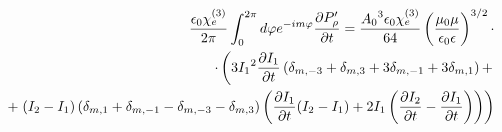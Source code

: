 %
%
%
\begin{equation*} \begin{aligned}
\frac{\epsilon_0 \chi_e^{(3)}}{2 \pi} \int_{0}^{2\pi} d \varphi 
e^{-im \varphi} \frac{\partial P_\rho^\prime}{\partial t} = 
\frac{ {A_0}^3 \epsilon_0 \chi_e^{(3)}}{ 64 } 
\left( \frac{\mu_0 \mu} {\epsilon_0 \epsilon} \right)^{3/2} \cdot \\ 
\cdot \left( 3 {I_1}^2 \frac{\partial I_1}{\partial t} \left( \delta_{m,-3} + 
\delta_{m,3} + 3 \delta_{m,-1} + 3 \delta_{m,1} \right) + \right. \\
+ \left. ( I_2 - I_1 ) \left( \delta_{m,1} + \delta_{m,-1} - 
\delta_{m,-3} - \delta_{m,3} \right) \left( 
\frac{\partial I_1}{\partial t} ( I_2 - I_1 ) + 2 I_1 \left( \frac{\partial I_2}{\partial t} - 
\frac{\partial I_1}{\partial t} \right) \right) \right)
\end{aligned} \end{equation*}
